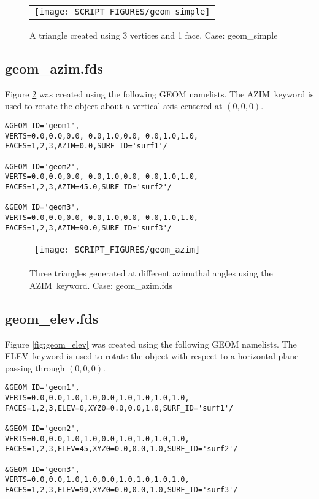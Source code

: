 \documentclass[12pt]{article}
\begin{document}
\begin{figure}
\begin{center}
\begin{tabular}{c}
 \texttt{[image: SCRIPT\_FIGURES/geom\_simple]}
  \end{tabular}
\end{center}
 \caption{A triangle created using 3 vertices and 1 face. Case: geom\_simple}
\label{fig:geom_simple}
\end{figure}

\subsection{geom\_azim.fds}
Figure \ref{fig:geom_azim} was created using the following GEOM namelists.
The {\ct AZIM}\ keyword is used to rotate the object about a vertical axis
centered at $(0,0,0)$.

{\small
\begin{verbatim}
&GEOM ID='geom1',
VERTS=0.0,0.0,0.0, 0.0,1.0,0.0, 0.0,1.0,1.0,
FACES=1,2,3,AZIM=0.0,SURF_ID='surf1'/

&GEOM ID='geom2',
VERTS=0.0,0.0,0.0, 0.0,1.0,0.0, 0.0,1.0,1.0,
FACES=1,2,3,AZIM=45.0,SURF_ID='surf2'/

&GEOM ID='geom3',
VERTS=0.0,0.0,0.0, 0.0,1.0,0.0, 0.0,1.0,1.0,
FACES=1,2,3,AZIM=90.0,SURF_ID='surf3'/
\end{verbatim}
}

\begin{figure}
\begin{center}
\begin{tabular}{c}
 \texttt{[image: SCRIPT\_FIGURES/geom\_azim]}
  \end{tabular}
\end{center}
 \caption{Three triangles generated at different azimuthal angles using the {\ct AZIM}\ keyword. Case: geom\_azim.fds}
\label{fig:geom_azim}
\end{figure}

\subsection{geom\_elev.fds}
Figure \ref{fig:geom_elev} was created using the following GEOM namelists.
The {\ct ELEV}\ keyword is used to rotate the object with respect to a horizontal plane
passing through $(0,0,0)$.

{\small
\begin{verbatim}
&GEOM ID='geom1',
VERTS=0.0,0.0,1.0,1.0,0.0,1.0,1.0,1.0,1.0,
FACES=1,2,3,ELEV=0,XYZ0=0.0,0.0,1.0,SURF_ID='surf1'/

&GEOM ID='geom2',
VERTS=0.0,0.0,1.0,1.0,0.0,1.0,1.0,1.0,1.0,
FACES=1,2,3,ELEV=45,XYZ0=0.0,0.0,1.0,SURF_ID='surf2'/

&GEOM ID='geom3',
VERTS=0.0,0.0,1.0,1.0,0.0,1.0,1.0,1.0,1.0,
FACES=1,2,3,ELEV=90,XYZ0=0.0,0.0,1.0,SURF_ID='surf3'/
\end{verbatim}
}
\end{document}
